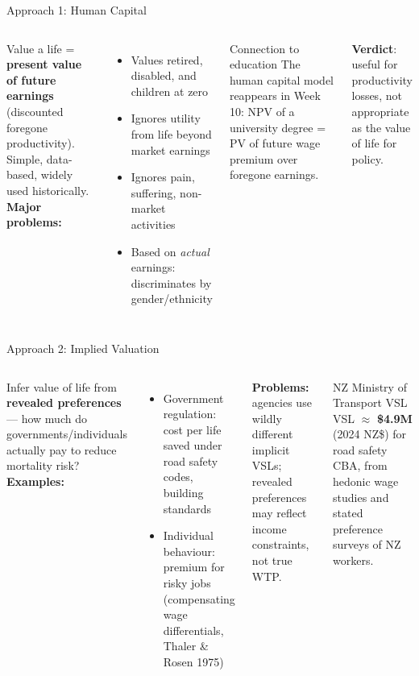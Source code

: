 \documentclass[aspectratio=169, 12pt]{beamer}
\begin{document}
\begin{frame}{Approach 1: Human Capital}
  \begin{columns}
      \small
      Value a life = \textbf{present value of future earnings} (discounted foregone productivity). Simple, data-based, widely used historically.\\[0.3em]
      \textbf{Major problems:}
      \begin{itemize}
        \item Values retired, disabled, and children at zero
        \item Ignores utility from life beyond market earnings
        \item Ignores pain, suffering, non-market activities
        \item Based on \emph{actual} earnings: discriminates by gender/ethnicity
      \end{itemize}
      \begin{exampleblock}{Connection to education}
        \small The human capital model reappears in Week 10: NPV of a university degree = PV of future wage premium over foregone earnings.
      \end{exampleblock}
      \vspace{0.3em}
      \small \textbf{Verdict}: useful for productivity losses, not appropriate as the value of life for policy.
  \end{columns}
\end{frame}

\begin{frame}{Approach 2: Implied Valuation}
  \begin{columns}
      \small
      Infer value of life from \textbf{revealed preferences} --- how much do governments/individuals actually pay to reduce mortality risk?\\[0.25em]
      \textbf{Examples:}
      \begin{itemize}
        \item Government regulation: cost per life saved under road safety codes, building standards
        \item Individual behaviour: premium for risky jobs (compensating wage differentials, Thaler \& Rosen 1975)
      \end{itemize}
      \textbf{Problems:} agencies use wildly different implicit VSLs; revealed preferences may reflect income constraints, not true WTP.
      \begin{exampleblock}{NZ Ministry of Transport VSL}
        \small VSL $\approx$ \textbf{\$4.9M} (2024 NZ\$) for road safety CBA, from hedonic wage studies and stated preference surveys of NZ workers.
      \end{exampleblock}
  \end{columns}
\end{frame}
\end{document}
